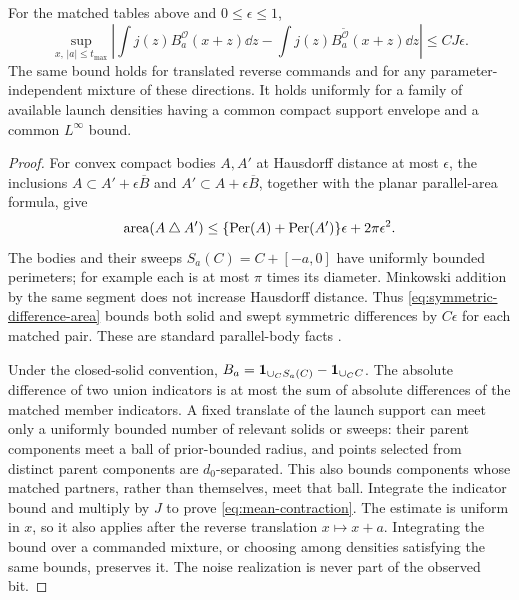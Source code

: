 \begin{lemma}
\label{lem:mean-contraction}
For the matched tables above and $0\le\epsilon\le1$,
\begin{equation}\label{eq:mean-contraction}
 \sup_{x,\,|a|\le t_{\max}}
 \left|\int j(z)B_a^{\mathcal O}(x+z)\dd z
       -\int j(z)B_a^{\widetilde{\mathcal O}}(x+z)\dd z\right|
                      \le C J\epsilon.
\end{equation}
The same bound holds for translated reverse commands and for any
parameter-independent mixture of these directions. It holds uniformly
for a family of available launch densities having a common compact
support envelope and a common $L^\infty$ bound.
\end{lemma}
\begin{proof}
For convex compact bodies $A,A'$ at Hausdorff distance at most
$\epsilon$, the inclusions
$A\subset A'+\epsilon\overline B$ and $A'\subset A+\epsilon\overline B$,
together with the planar parallel-area formula, give
\begin{equation}\label{eq:symmetric-difference-area}
 \operatorname{area}(A\mathbin\triangle A')
 \le\{\operatorname{Per}(A)+\operatorname{Per}(A')\}\epsilon
                                                   +2\pi\epsilon^2.
\end{equation}
The bodies and their sweeps $S_a(C)=C+[-a,0]$ have uniformly bounded
perimeters; for example each is at most $\pi$ times its diameter.
Minkowski addition by the same segment does not increase Hausdorff
distance. Thus \eqref{eq:symmetric-difference-area} bounds both solid
and swept symmetric differences by $C\epsilon$ for each matched pair.
These are standard parallel-body facts \cite{Schneider}.

Under the closed-solid convention,
$B_a=\mathbf 1_{\cup_C S_a(C)}-\mathbf 1_{\cup_C C}$.
The absolute difference of two union indicators is at most the sum
of absolute differences of the matched member indicators. A fixed
translate of the launch support can meet only a uniformly bounded
number of relevant solids or sweeps: their parent components meet a
ball of prior-bounded radius, and points selected from distinct parent
components are $d_0$-separated. This also bounds components whose matched
partners, rather than themselves, meet that ball. Integrate the indicator
bound and multiply by $J$ to prove \eqref{eq:mean-contraction}.
The estimate is uniform in $x$, so it also applies after the reverse
translation $x\mapsto x+a$. Integrating the bound over a commanded
mixture, or choosing among densities satisfying the same bounds,
preserves it. The noise realization is never part of the observed bit.
\end{proof}

